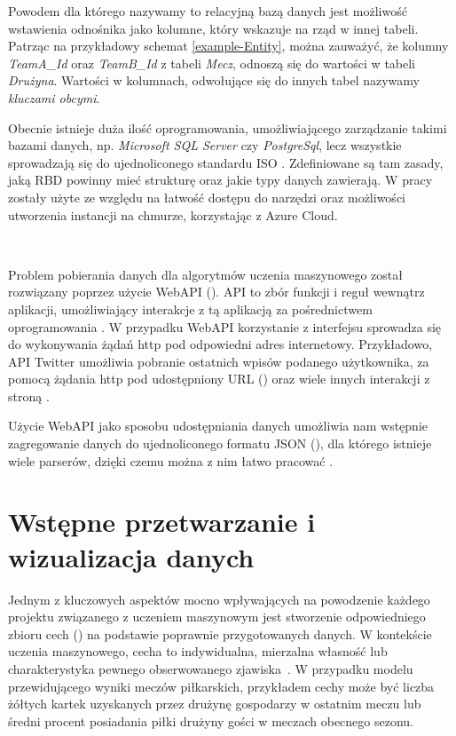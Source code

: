Powodem dla którego nazywamy to relacyjną bazą danych jest możliwość wstawienia odnośnika jako kolumne, który wskazuje na rząd w innej tabeli. Patrząc na przykładowy schemat \ref{example-Entity}, można zauważyć, że kolumny \textit{TeamA\_Id} oraz \textit{TeamB\_Id} z tabeli \textit{Mecz}, odnoszą się do wartości w tabeli \textit{Drużyna}. Wartości w kolumnach, odwołujące się do innych tabel nazywamy \textit{kluczami obcymi}. \cite{Relational_Databases_Milan}

Obecnie istnieje duża ilość oprogramowania, umożliwiającego zarządzanie takimi bazami danych, np. \textit{Microsoft SQL Server} czy \textit{PostgreSql}, lecz wszystkie sprowadzają się do ujednoliconego standardu ISO \cite{SQL_ISO}. Zdefiniowane są tam zasady, jaką RBD powinny mieć strukturę oraz jakie typy danych zawierają. W pracy zostały użyte ze względu na łatwość dostępu do narzędzi oraz możliwości utworzenia instancji na chmurze, korzystając z Azure Cloud.

~

Problem pobierania danych dla algorytmów uczenia maszynowego został rozwiązany poprzez użycie WebAPI (). API to zbór funkcji i reguł wewnątrz aplikacji, umożliwiający interakcje z tą aplikacją za pośrednictwem oprogramowania \cite{webAPI_Mozzila}. W przypadku WebAPI korzystanie z interfejsu sprowadza się do wykonywania żądań http pod odpowiedni adres internetowy. Przykładowo, API Twitter umożliwia pobranie ostatnich wpisów podanego użytkownika, za pomocą żądania http pod udostępniony URL () oraz wiele innych interakcji z stroną \cite{Twitter_API}.

Użycie WebAPI jako sposobu udostępniania danych umożliwia nam wstępnie zagregowanie danych do ujednoliconego formatu JSON (), dla którego istnieje wiele parserów, dzięki czemu można z nim łatwo pracować \cite{JsonParserPython}.

\section{Wstępne przetwarzanie i wizualizacja danych}

\noindent 

Jednym z kluczowych aspektów mocno wpływających na powodzenie każdego projektu związanego z uczeniem maszynowym jest stworzenie odpowiedniego zbioru cech () na podstawie poprawnie przygotowanych danych. W kontekście uczenia maszynowego, cecha to indywidualna, mierzalna własność lub charakterystyka pewnego obserwowanego zjawiska~\cite{Wiki:Feature}. W przypadku modelu przewidującego wyniki meczów piłkarskich, przykładem cechy może być liczba żółtych kartek uzyskanych przez drużynę gospodarzy w ostatnim meczu lub średni procent posiadania piłki drużyny gości w meczach obecnego sezonu.

